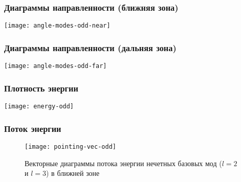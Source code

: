 \documentclass[compress]{beamer}
\begin{document}

    \begin{frame}\frametitle{Диаграммы направленности (ближняя зона)}

        \centering\texttt{[image: angle-modes-odd-near]}

    \end{frame}


    \begin{frame}\frametitle{Диаграммы направленности (дальняя зона)}

        \centering\texttt{[image: angle-modes-odd-far]}

    \end{frame}


    \begin{frame}\frametitle{Плотность энергии}

        \centering\texttt{[image: energy-odd]}

    \end{frame}


    \begin{frame}\frametitle{Поток энергии}

        \begin{figure}[!htb]%
            \centering\texttt{[image: pointing-vec-odd]}%
            \captionsetup{labelformat=empty}
            \caption[]{Векторные диаграммы потока энергии нечетных базовых мод ($l=2$ и $l=3$) в ближней зоне}
        \end{figure}

    \end{frame}
\end{document}
